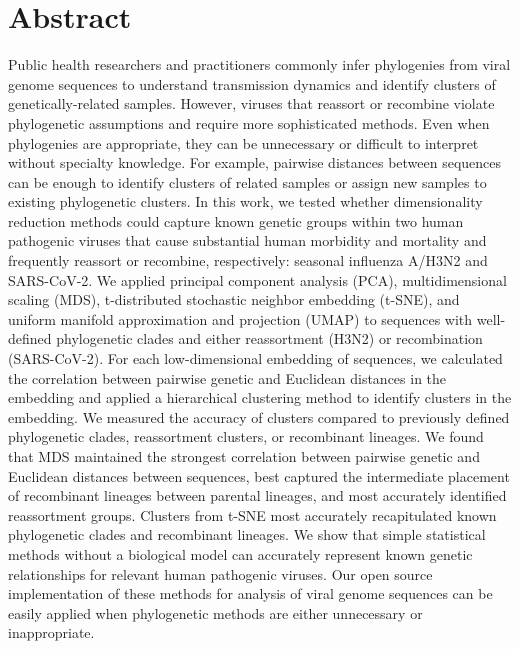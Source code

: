 \documentclass[10pt,letterpaper]{article}
\begin{document}
\section*{Abstract}
Public health researchers and practitioners commonly infer phylogenies from viral genome sequences to understand transmission dynamics and identify clusters of genetically-related samples.
However, viruses that reassort or recombine violate phylogenetic assumptions and require more sophisticated methods.
Even when phylogenies are appropriate, they can be unnecessary or difficult to interpret without specialty knowledge.
For example, pairwise distances between sequences can be enough to identify clusters of related samples or assign new samples to existing phylogenetic clusters.
In this work, we tested whether dimensionality reduction methods could capture known genetic groups within two human pathogenic viruses that cause substantial human morbidity and mortality and frequently reassort or recombine, respectively: seasonal influenza A/H3N2 and SARS-CoV-2.
We applied principal component analysis (PCA), multidimensional scaling (MDS), t-distributed stochastic neighbor embedding (t-SNE), and uniform manifold approximation and projection (UMAP) to sequences with well-defined phylogenetic clades and either reassortment (H3N2) or recombination (SARS-CoV-2).
For each low-dimensional embedding of sequences, we calculated the correlation between pairwise genetic and Euclidean distances in the embedding and applied a hierarchical clustering method to identify clusters in the embedding.
We measured the accuracy of clusters compared to previously defined phylogenetic clades, reassortment clusters, or recombinant lineages.
We found that MDS maintained the strongest correlation between pairwise genetic and Euclidean distances between sequences, best captured the intermediate placement of recombinant lineages between parental lineages, and most accurately identified reassortment groups.
Clusters from t-SNE most accurately recapitulated known phylogenetic clades and recombinant lineages.
We show that simple statistical methods without a biological model can accurately represent known genetic relationships for relevant human pathogenic viruses.
Our open source implementation of these methods for analysis of viral genome sequences can be easily applied when phylogenetic methods are either unnecessary or inappropriate.

\end{document}
